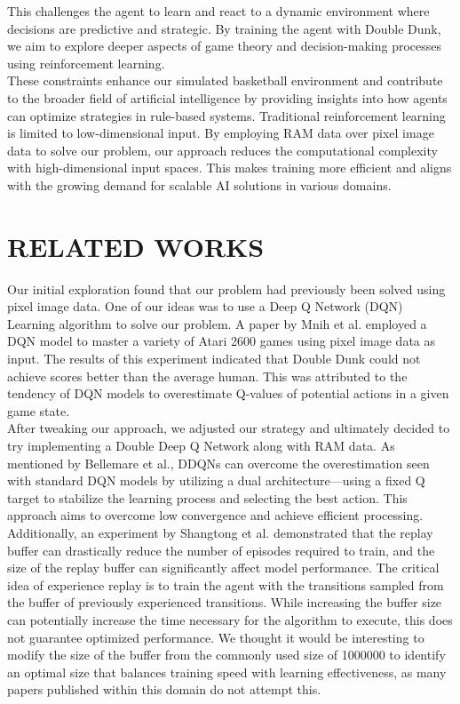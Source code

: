 \documentclass[letterpaper, 10 pt, conference]{ieeeconf}
\begin{document}
This challenges the agent to learn and react to a dynamic environment where decisions are predictive and strategic. By training the agent with Double Dunk, we aim to explore deeper aspects of game theory and decision-making processes using reinforcement learning.\\

These constraints enhance our simulated basketball environment and contribute to the broader field of artificial intelligence by providing insights into how agents can optimize strategies in rule-based systems. Traditional reinforcement learning is limited to low-dimensional input. By employing RAM data over pixel image data to solve our problem, our approach reduces the computational complexity with high-dimensional input spaces. This makes training more efficient and aligns with the growing demand for scalable AI solutions in various domains. \\

\section{\textbf{RELATED WORKS}}
\vspace{.5cm}
Our initial exploration found that our problem had previously been solved using pixel image data. One of our ideas was to use a Deep Q Network (DQN) Learning algorithm to solve our problem. A paper by Mnih et al. employed a DQN model to master a variety of Atari 2600 games using pixel image data as input.  The results of this experiment indicated that Double Dunk could not achieve scores better than the average human. This was attributed to the tendency of DQN models to overestimate Q-values of potential actions in a given game state. \\

After tweaking our approach, we adjusted our strategy and ultimately decided to try implementing a Double Deep Q Network along with RAM data. As mentioned by Bellemare et al., DDQNs can overcome the overestimation seen with standard DQN models by utilizing a dual architecture—using a fixed Q target to stabilize the learning process and selecting the best action. This approach aims to overcome low convergence and achieve efficient processing. \\

Additionally, an experiment by Shangtong et al. demonstrated that the replay buffer can drastically reduce the number of episodes required to train, and the size of the replay buffer can significantly affect model performance. The critical idea of experience replay is to train the agent with the transitions sampled from the buffer of previously experienced transitions. While increasing the buffer size can potentially increase the time necessary for the algorithm to execute, this does not guarantee optimized performance. We thought it would be interesting to modify the size of the buffer from the commonly used size of 1000000 to identify an optimal size that balances training speed with learning effectiveness, as many papers published within this domain do not attempt this.\\
\end{document}
